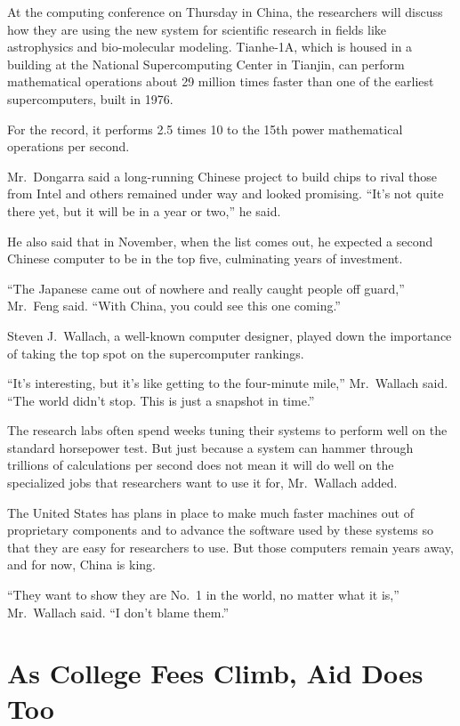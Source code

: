 ﻿\documentclass[12pt]{article}
\begin{document}
At the computing conference on Thursday in China, the researchers will discuss how they are using
the new system for scientific research in fields like astrophysics and bio-molecular modeling.
Tianhe-1A, which is housed in a building at the National Supercomputing Center in Tianjin, can
perform mathematical operations about 29 million times faster than one of the earliest
supercomputers, built in 1976.

For the record, it performs 2.5 times 10 to the 15th power mathematical operations per second.

Mr.~Dongarra said a long-running Chinese project to build chips to rival those from Intel and others
remained under way and looked promising. ``It's not quite there yet, but it will be in a year or
two,'' he said.

He also said that in November, when the list comes out, he expected a second Chinese computer to be
in the top five, culminating years of investment.

``The Japanese came out of nowhere and really caught people off guard,'' Mr.~Feng said. ``With
China, you could see this one coming.''

Steven J.~Wallach, a well-known computer designer, played down the importance of taking the top spot
on the supercomputer rankings.

``It's interesting, but it's like getting to the four-minute mile,'' Mr.~Wallach said. ``The world
didn't stop. This is just a snapshot in time.''

The research labs often spend weeks tuning their systems to perform well on the standard horsepower
test. But just because a system can hammer through trillions of calculations per second does not
mean it will do well on the specialized jobs that researchers want to use it for, Mr.~Wallach added.

The United States has plans in place to make much faster machines out of proprietary components and
to advance the software used by these systems so that they are easy for researchers to use. But
those computers remain years away, and for now, China is king.

``They want to show they are No.~1 in the world, no matter what it is,'' Mr.~Wallach said. ``I don't
blame them.''

\section{As College Fees Climb, Aid Does Too}
\end{document}
